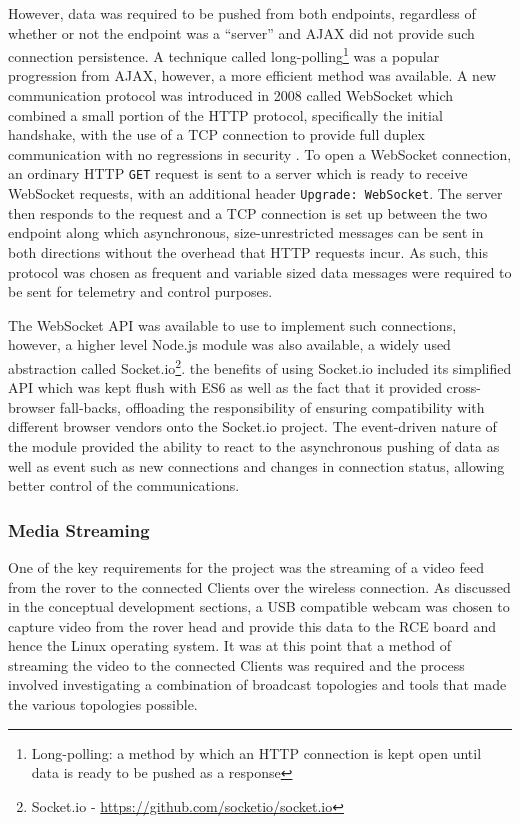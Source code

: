      However, data was required to be pushed from both endpoints, regardless of whether or not the endpoint was a ``server'' and AJAX did not provide such connection persistence. A technique called long-polling\footnote{Long-polling: a method by which an HTTP connection is kept open until data is ready to be pushed as a response} was a popular progression from AJAX, however, a more efficient method was available. A new communication protocol was introduced in 2008 called WebSocket which combined a small portion of the HTTP protocol, specifically the initial handshake, with the use of a TCP connection to provide full duplex communication with no regressions in security \cite{websocket_2016}. To open a WebSocket connection, an ordinary HTTP \texttt{GET} request is sent to a server which is ready to receive WebSocket requests, with an additional header \texttt{Upgrade: WebSocket}. The server then responds to the request and a TCP connection is set up between the two endpoint along which asynchronous, size-unrestricted messages can be sent in both directions without the overhead that HTTP requests incur. As such, this protocol was chosen as frequent and variable sized data messages were required to be sent for telemetry and control purposes.
      
      The WebSocket API was available to use to implement such connections, however, a higher level Node.js module was also available, a widely used abstraction called Socket.io\footnote{Socket.io - \url{https://github.com/socketio/socket.io}}. the benefits of using Socket.io included its simplified API which was kept flush with ES6 as well as the fact that it provided cross-browser fall-backs, offloading the responsibility of ensuring compatibility with different browser vendors onto the Socket.io project. The event-driven nature of the module provided the ability to react to the asynchronous pushing of data as well as event such as new connections and changes in connection status, allowing better control of the communications.
      
      
    \subsubsection{Media Streaming}
      One of the key requirements for the project was the streaming of a video feed from the rover to the connected Clients over the wireless connection. As discussed in the conceptual development sections, a USB compatible webcam was chosen to capture video from the rover head and provide this data to the RCE board and hence the Linux operating system. It was at this point that a method of streaming the video to the connected Clients was required and the process involved investigating a combination of broadcast topologies and tools that made the various topologies possible.
      

